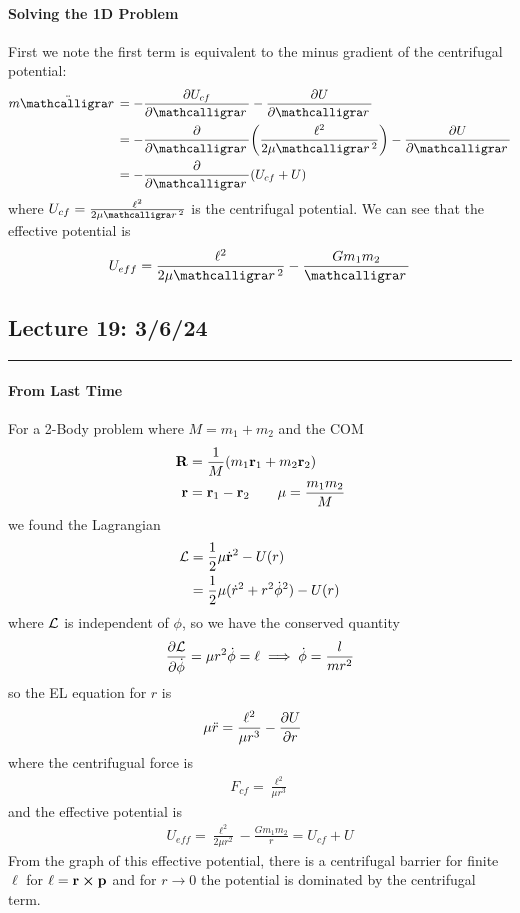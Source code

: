 \documentclass[../main.tex]{subfiles}
\begin{document}
\paragraph*{Solving the 1D Problem} First we note the first term is equivalent to the minus
gradient of the centrifugal potential:
\begin{align*}
    m \ddot\scriptr &= -\pdv{U_{cf}}{\scriptr} - \pdv{U}{\scriptr} \\
    &= -\pdv{\scriptr}(\frac{\ell^2}{2\mu \scriptr^2}) - \pdv{U}{\scriptr} \\
    &= -\pdv{\scriptr}(U_{cf} + U)
\end{align*}
where $U_{cf} = \frac{\ell^2}{2\mu \scriptr^2}$ is the centrifugal potential. We can see that the
effective potential is
\begin{align*}
    U_{eff} = \frac{\ell^2}{2\mu \scriptr^2} - \frac{G m_1 m_2}{\scriptr}
\end{align*}

\newpage
\subsection*{Lecture 19: \hfill  3/6/24}
\hrule \vspace{10px}

\paragraph*{From Last Time} For a 2-Body problem where $M = m_1 + m_2$ and the COM
\begin{align*}
    \vb R &= \frac{1}{M} (m_1 \vb r_1 + m_2 \vb r_2) \\
    \vb r &= \vb r_1 - \vb r_2 \qquad \mu = \frac{m_1 m_2}{M}
\end{align*}
we found the Lagrangian
\begin{align*}
    \mathcal{L} &= \frac{1}{2} \mu \dot{\vb r}^2 - U(r) \\
        &= \frac{1}{2} \mu (\dot r^2 + r^2 \dot\phi^2) - U(r)
\end{align*}
where $\mathcal{L}$ is independent of $\phi$, so we have the conserved quantity
\begin{align*}
    \pdv{\mathcal{L}}{\dot \phi} = \mu r^2 \dot\phi = \ell \implies \dot\phi = \frac{l}{mr^2}
\end{align*}
so the EL equation for $r$ is
\begin{align*}
    \mu \ddot r &= \frac{\ell^2}{\mu r^3} - \pdv{U}{r}
\end{align*}
where the centrifugual force is
\begin{align*}
    F_{cf} = \frac{\ell^2}{\mu r^3}
\end{align*}
and the effective potential is
\begin{align*}
    U_{eff} = \frac{\ell^2}{2\mu r^2} - \frac{G m_1 m_2}{r} = U_{cf} + U
\end{align*}
From the graph of this effective potential, there is a centrifugal barrier for finite $\ell$ for
$\vb \ell = \vb r \cross \vb p$ and for $r \to 0$ the potential is dominated by the centrifugal term.
\end{document}
